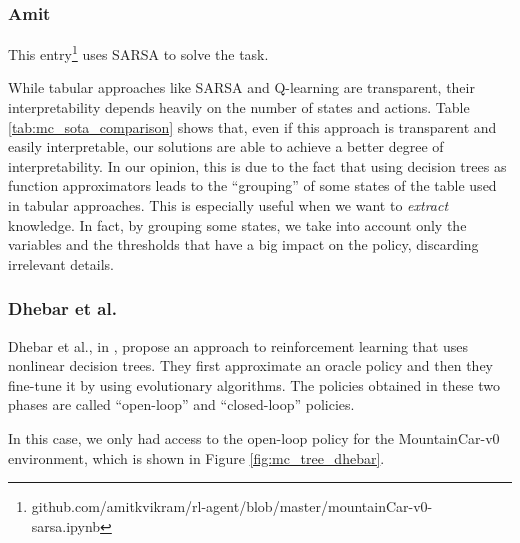 \documentclass[review,english]{elsarticle}
\begin{document}
\subsubsection{Amit}
This entry\footnote{github.com/amitkvikram/rl-agent/blob/master/mountainCar-v0-sarsa.ipynb} uses SARSA to solve the task.

While tabular approaches like SARSA and Q-learning are transparent, their interpretability depends heavily on the number of states and actions.
Table \ref{tab:mc_sota_comparison} shows that, even if this approach is transparent and easily interpretable, our solutions are able to achieve a better degree of interpretability. 
In our opinion, this is due to the fact that using decision trees as function approximators leads to the ``grouping'' of some states of the table used in tabular approaches.
This is especially useful when we want to \textit{extract} knowledge. 
In fact, by grouping some states, we take into account only the variables and the thresholds that have a big impact on the policy, discarding irrelevant details.

\subsubsection{Dhebar et al.}
Dhebar et al., in \cite{dhebar_interpretable-ai_2020}, propose an approach to reinforcement learning that uses nonlinear decision trees.
They first approximate an oracle policy and then they fine-tune it by using evolutionary algorithms. The policies obtained in these two phases are called ``open-loop'' and ``closed-loop'' policies.

In this case, we only had access to the open-loop policy for the MountainCar-v0 environment, which is shown in Figure \ref{fig:mc_tree_dhebar}.
\end{document}
